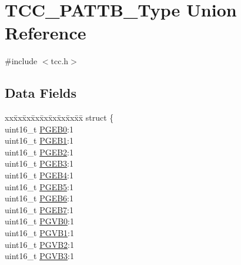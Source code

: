 \hypertarget{union_t_c_c___p_a_t_t_b___type}{}\section{T\+C\+C\+\_\+\+P\+A\+T\+T\+B\+\_\+\+Type Union Reference}
\label{union_t_c_c___p_a_t_t_b___type}


{\ttfamily \#include $<$tcc.\+h$>$}

\subsection*{Data Fields}
\begin{DoxyCompactItemize}
\item 
\begin{tabbing}
xx\=xx\=xx\=xx\=xx\=xx\=xx\=xx\=xx\=\kill
struct \{\\
\>uint16\_t \mbox{\hyperlink{union_t_c_c___p_a_t_t_b___type_a8588200484996495fcc1723e46246650}{PGEB0}}:1\\
\>uint16\_t \mbox{\hyperlink{union_t_c_c___p_a_t_t_b___type_af666764057cf7f908f7db8f9c1051d73}{PGEB1}}:1\\
\>uint16\_t \mbox{\hyperlink{union_t_c_c___p_a_t_t_b___type_ac282187c33dcd75622bfb962400250c6}{PGEB2}}:1\\
\>uint16\_t \mbox{\hyperlink{union_t_c_c___p_a_t_t_b___type_a4eeab7a44dafbe7d012acaeef5ed209b}{PGEB3}}:1\\
\>uint16\_t \mbox{\hyperlink{union_t_c_c___p_a_t_t_b___type_a4c7ee621a16f7e0c6668ea35ae62da54}{PGEB4}}:1\\
\>uint16\_t \mbox{\hyperlink{union_t_c_c___p_a_t_t_b___type_ae6e15400ee251b0d4045df6b63aa1e55}{PGEB5}}:1\\
\>uint16\_t \mbox{\hyperlink{union_t_c_c___p_a_t_t_b___type_a99e249cc4f5daac8e0366f881cf3591f}{PGEB6}}:1\\
\>uint16\_t \mbox{\hyperlink{union_t_c_c___p_a_t_t_b___type_a6c857354de5486785a5548723bd28374}{PGEB7}}:1\\
\>uint16\_t \mbox{\hyperlink{union_t_c_c___p_a_t_t_b___type_a7d1e619b85e3cb03379dc1bdef5c1282}{PGVB0}}:1\\
\>uint16\_t \mbox{\hyperlink{union_t_c_c___p_a_t_t_b___type_ae94ebf02d4b9a9c78c8b0489978ac8cb}{PGVB1}}:1\\
\>uint16\_t \mbox{\hyperlink{union_t_c_c___p_a_t_t_b___type_a302b467ac255fa57d2ba93e93e5045e2}{PGVB2}}:1\\
\>uint16\_t \mbox{\hyperlink{union_t_c_c___p_a_t_t_b___type_a767a0751f0284295b09c486a83f3a105}{PGVB3}}:1\\

\end{tabbing}
\end{DoxyCompactItemize}
